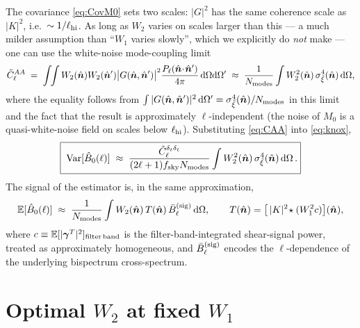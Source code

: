 \documentclass[11pt]{article}
\newcommand{\shear}{\boldsymbol{\gamma}}
\newcommand{\nv}{\hat{\boldsymbol{n}}}
\newcommand{\dom}{\mathrm{d}\Omega}
\newcommand{\E}{\mathbb{E}}
\newcommand{\Var}{\mathrm{Var}}
\newcommand{\deltat}{\delta_t}
\newcommand{\Nmodes}{N_{\rm modes}}
\newcommand{\Wone}{W_1}
\newcommand{\Wtwo}{W_2}
\begin{document}
The covariance \cref{eq:CovM0} sets two scales: $|G|^2$ has the same
coherence scale as $|K|^2$, i.e.\ $\sim 1/\ell_{\rm hi}$. As long as $\Wtwo$
varies on scales larger than this --- a much milder assumption than
``$\Wone$ varies slowly'', which we explicitly do \emph{not} make --- one can
use the white-noise mode-coupling limit
\begin{equation}
\tilde C^{AA}_\ell
\;=\;\int\!\!\int W_2(\nv)W_2(\nv')\bigl|G(\nv,\nv')\bigr|^2
\frac{P_\ell(\nv\!\cdot\!\nv')}{4\pi}\,\dom\dom'
\;\approx\;\frac{1}{\Nmodes}\int \Wtwo^2(\nv)\,\sigma^4_{\tilde\xi}(\nv)\,\dom,
\label{eq:CAA}
\end{equation}
where the equality follows from $\int|G(\nv,\nv')|^2\,\dom'
=\sigma^4_{\tilde\xi}(\nv)/\Nmodes$ in this limit and the fact that the
result is approximately $\ell$-independent (the noise of $M_0$ is a
quasi-white-noise field on scales below $\ell_{\rm hi}$). Substituting
\cref{eq:CAA} into \cref{eq:knox},
\begin{equation}
\boxed{\;
\Var[\hat B_0(\ell)]
\;\approx\;
\frac{\tilde C^{\deltat\deltat}_\ell}{(2\ell+1)f_{\rm sky}\Nmodes}
\int \Wtwo^2(\nv)\,\sigma^4_{\tilde\xi}(\nv)\,\dom\,.}
\label{eq:Var_master}
\end{equation}
The signal of the estimator is, in the same approximation,
\begin{equation}
\E[\hat B_0(\ell)]
\;\approx\;\frac{1}{\Nmodes}\int \Wtwo(\nv)\,T(\nv)\,\bar B_\ell^{(\rm sig)}\,\dom,
\qquad
T(\nv)=\bigl[\,|K|^2\!\star(\Wone^2 c)\bigr](\nv),
\label{eq:signal_master}
\end{equation}
where $c\equiv\E[|\shear^T|^2]_{\rm filter\,band}$ is the
filter-band-integrated shear-signal power, treated as approximately
homogeneous, and $\bar B_\ell^{(\rm sig)}$ encodes the $\ell$-dependence of
the underlying bispectrum cross-spectrum.

\section{Optimal $\Wtwo$ at fixed $\Wone$}
\end{document}
